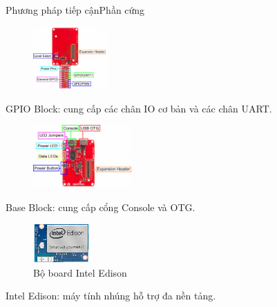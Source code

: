 \documentclass[compress, blue, 13pt,hyperref={pdfpagemode=FullScreen}]{beamer}
\begin{document}
\begin{frame}{Phương pháp tiếp cận}{Phần cứng}
\begin{multicols}{2}
\begin{figure}[hbtp]
\centering
\includegraphics[height = 2.4cm]{images/GPIOBlockAnnotated.png}
\end{figure}
\columnbreak 

GPIO Block: cung cấp các chân IO cơ bản và các chân UART.
\end{multicols}
\begin{multicols}{2}
\begin{figure}[hbtp]
\centering
\includegraphics[height = 2.4cm]{images/BaseAnnotated.png}
\end{figure}
\columnbreak 

Base Block: cung cấp cổng Console và OTG.
\end{multicols}
\begin{multicols}{2}
\begin{figure}[hbtp]
\centering
\includegraphics[height = 1.5cm]{images/MakerBoards-Edison.jpg}
\caption{Bộ board Intel Edison}
\end{figure}
\columnbreak 

Intel Edison: máy tính nhúng hỗ trợ đa nền tảng.
\end{multicols}
\end{frame}
\end{document}
